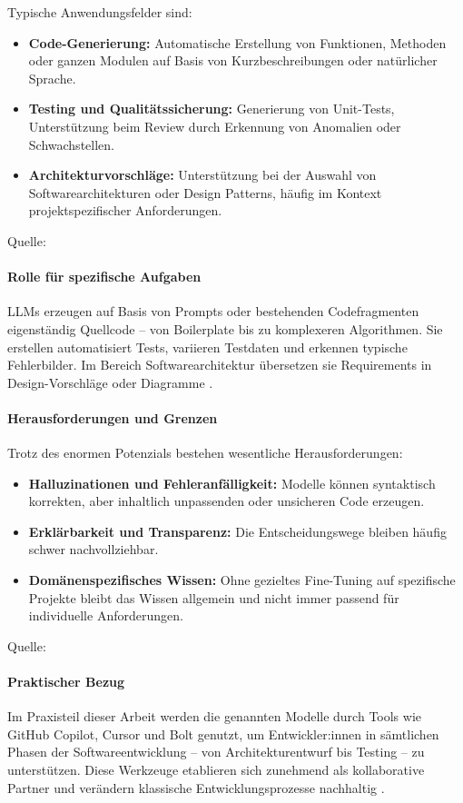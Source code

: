 Typische Anwendungsfelder sind:
\begin{itemize}
    \item \textbf{Code-Generierung:} Automatische Erstellung von Funktionen, Methoden oder ganzen Modulen auf Basis von Kurzbeschreibungen oder natürlicher Sprache.
    \item \textbf{Testing und Qualitätssicherung:} Generierung von Unit-Tests, Unterstützung beim Review durch Erkennung von Anomalien oder Schwachstellen.
    \item \textbf{Architekturvorschläge:} Unterstützung bei der Auswahl von Softwarearchitekturen oder Design Patterns, häufig im Kontext projektspezifischer Anforderungen.
\end{itemize}
Quelle: \cite{coutinho_role_2024, esposito_generative_2025, donvir_role_2024}

\paragraph{Rolle für spezifische Aufgaben}
LLMs erzeugen auf Basis von Prompts oder bestehenden Codefragmenten
eigenständig Quellcode – von Boilerplate bis zu komplexeren Algorithmen. Sie
erstellen automatisiert Tests, variieren Testdaten und erkennen typische
Fehlerbilder. Im Bereich Softwarearchitektur übersetzen sie Requirements in
Design-Vorschläge oder Diagramme \cite{esposito_generative_2025,
    nguyen-duc_generative_2023}.

\paragraph{Herausforderungen und Grenzen }
Trotz des enormen Potenzials bestehen wesentliche Herausforderungen:
\begin{itemize}
    \item \textbf{Halluzinationen und Fehleranfälligkeit:} Modelle können syntaktisch korrekten, aber inhaltlich unpassenden oder unsicheren Code erzeugen.
    \item \textbf{Erklärbarkeit und Transparenz:} Die Entscheidungswege bleiben häufig schwer nachvollziehbar.
    \item \textbf{Domänenspezifisches Wissen:} Ohne gezieltes Fine-Tuning auf spezifische Projekte bleibt das Wissen allgemein und nicht immer passend für individuelle Anforderungen.
\end{itemize}
Quelle: \cite{esposito_generative_2025, nguyen-duc_generative_2023, donvir_role_2024}

\paragraph{Praktischer Bezug}
Im Praxisteil dieser Arbeit werden die genannten Modelle durch Tools wie GitHub
Copilot, Cursor und Bolt genutzt, um Entwickler:innen in sämtlichen Phasen der
Softwareentwicklung – von Architekturentwurf bis Testing – zu unterstützen.
Diese Werkzeuge etablieren sich zunehmend als kollaborative Partner und
verändern klassische Entwicklungsprozesse nachhaltig
\cite{esposito_generative_2025, nguyen-duc_generative_2023}.
